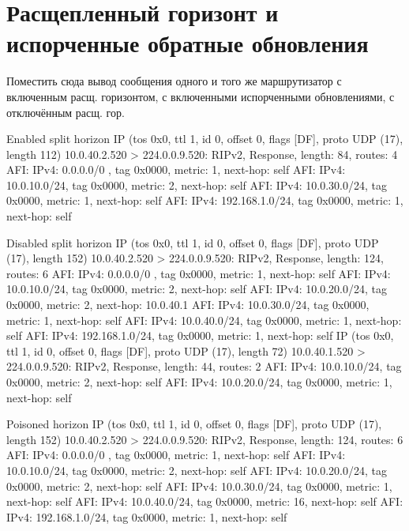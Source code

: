 \documentclass[a4paper,12pt]{article}
\begin{document}
\section{Расщепленный горизонт и испорченные обратные обновления}

Поместить сюда вывод сообщения одного и того же маршрутизатор с включенным расщ. горизонтом, с включенными испорченными обновлениями, с отключённым расщ. гор.

Enabled split horizon
IP (tos 0x0, ttl 1, id 0, offset 0, flags [DF], proto UDP (17), length 112) 10.0.40.2.520 > 224.0.0.9.520: 
        RIPv2, Response, length: 84, routes: 4
          AFI: IPv4:         0.0.0.0/0 , tag 0x0000, metric: 1, next-hop: self
          AFI: IPv4:       10.0.10.0/24, tag 0x0000, metric: 2, next-hop: self
          AFI: IPv4:       10.0.30.0/24, tag 0x0000, metric: 1, next-hop: self
          AFI: IPv4:     192.168.1.0/24, tag 0x0000, metric: 1, next-hop: self

Disabled split horizon
IP (tos 0x0, ttl 1, id 0, offset 0, flags [DF], proto UDP (17), length 152) 10.0.40.2.520 > 224.0.0.9.520: 
	RIPv2, Response, length: 124, routes: 6
	  AFI: IPv4:         0.0.0.0/0 , tag 0x0000, metric: 1, next-hop: self
	  AFI: IPv4:       10.0.10.0/24, tag 0x0000, metric: 2, next-hop: self
	  AFI: IPv4:       10.0.20.0/24, tag 0x0000, metric: 2, next-hop: 10.0.40.1
	  AFI: IPv4:       10.0.30.0/24, tag 0x0000, metric: 1, next-hop: self
	  AFI: IPv4:       10.0.40.0/24, tag 0x0000, metric: 1, next-hop: self
	  AFI: IPv4:     192.168.1.0/24, tag 0x0000, metric: 1, next-hop: self
IP (tos 0x0, ttl 1, id 0, offset 0, flags [DF], proto UDP (17), length 72) 10.0.40.1.520 > 224.0.0.9.520: 
	RIPv2, Response, length: 44, routes: 2
	  AFI: IPv4:       10.0.10.0/24, tag 0x0000, metric: 2, next-hop: self
	  AFI: IPv4:       10.0.20.0/24, tag 0x0000, metric: 1, next-hop: self

Poisoned horizon
IP (tos 0x0, ttl 1, id 0, offset 0, flags [DF], proto UDP (17), length 152) 10.0.40.2.520 > 224.0.0.9.520: 
	RIPv2, Response, length: 124, routes: 6
	  AFI: IPv4:         0.0.0.0/0 , tag 0x0000, metric: 1, next-hop: self
	  AFI: IPv4:       10.0.10.0/24, tag 0x0000, metric: 2, next-hop: self
	  AFI: IPv4:       10.0.20.0/24, tag 0x0000, metric: 2, next-hop: self
	  AFI: IPv4:       10.0.30.0/24, tag 0x0000, metric: 1, next-hop: self
	  AFI: IPv4:       10.0.40.0/24, tag 0x0000, metric: 16, next-hop: self
	  AFI: IPv4:     192.168.1.0/24, tag 0x0000, metric: 1, next-hop: self
\end{document}
